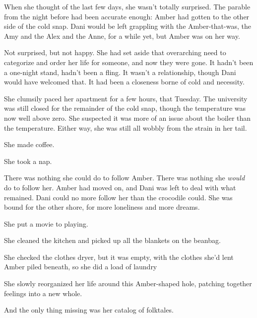 When she thought of the last few days, she wasn't totally surprised. The parable from the night before had been accurate enough: Amber had gotten to the other side of the cold snap. Dani would be left grappling with the Amber-that-was, the Amy and the Alex and the Anne, for a while yet, but Amber was on her way.

Not surprised, but not happy. She had set aside that overarching need to categorize and order her life for someone, and now they were gone. It hadn't been a one-night stand, hadn't been a fling. It wasn't a relationship, though Dani would have welcomed that. It had been a closeness borne of cold and necessity.

She clumsily paced her apartment for a few hours, that Tuesday. The university was still closed for the remainder of the cold snap, though the temperature was now well above zero. She suspected it was more of an issue about the boiler than the temperature. Either way, she was still all wobbly from the strain in her tail.

She made coffee.

She took a nap.

There was nothing she could do to follow Amber. There was nothing she \emph{would} do to follow her. Amber had moved on, and Dani was left to deal with what remained. Dani could no more follow her than the crocodile could. She was bound for the other shore, for more loneliness and more dreams.

She put a movie to playing.

She cleaned the kitchen and picked up all the blankets on the beanbag.

She checked the clothes dryer, but it was empty, with the clothes she'd lent Amber piled beneath, so she did a load of laundry

She slowly reorganized her life around this Amber-shaped hole, patching together feelings into a new whole.

And the only thing missing was her catalog of folktales.
